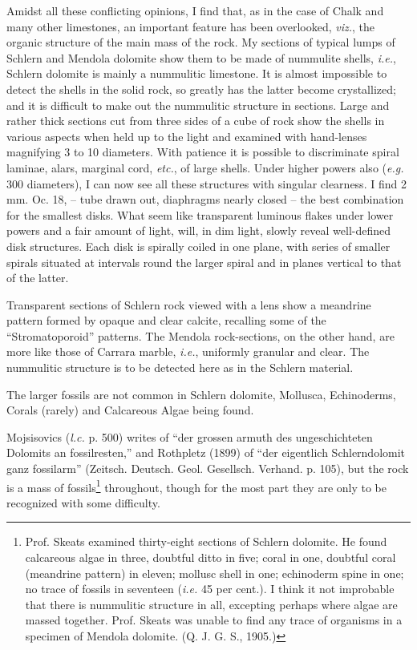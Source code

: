 \documentclass[a4paper, 12pt, oneside]{article}
\begin{document}
Amidst all these conflicting opinions, I find that, as in the case of Chalk and many other limestones, an important feature has been overlooked, \emph{viz.}, the organic structure of the main mass of the rock. My sections of typical lumps of Schlern and Mendola dolomite show them to be made of nummulite shells, \emph{i.e.}, Schlern dolomite is mainly a nummulitic limestone. It is almost impossible to detect the shells in the solid rock, so greatly has the latter become crystallized; and it is difficult to make out the nummulitic structure in sections. Large and rather thick sections cut from three sides of a cube of rock show the shells in various aspects when held up to the light and examined with hand-lenses magnifying 3 to 10 diameters. With patience it is possible to discriminate spiral laminae, alars, marginal cord, \emph{etc.}, of large shells. Under higher powers also (\emph{e.g.} 300 diameters), I can now see all these structures with singular clearness. I find 2 mm. Oc. 18, -- tube drawn out, diaphragms nearly closed -- the best combination for the smallest disks. What seem like transparent luminous flakes under lower powers and a fair amount of light, will, in dim light, slowly reveal well-defined disk structures. Each disk is spirally coiled in one plane, with series of smaller spirals situated at intervals round the larger spiral and in planes vertical to that of the latter.

Transparent sections of Schlern rock viewed with a lens show a meandrine pattern formed by opaque and clear calcite, recalling some of the ``Stromatoporoid'' patterns. The Mendola rock-sections, on the other hand, are more like those of Carrara marble, \emph{i.e.}, uniformly granular and clear. The nummulitic structure is to be detected here as in the Schlern material.

The larger fossils are not common in Schlern dolomite, Mollusca, Echinoderms, Corals (rarely) and Calcareous Algae being found.

Mojsisovics (\emph{l.c.} p. 500) writes of ``der grossen armuth des ungeschichteten Dolomits an fossilresten,'' and Rothpletz (1899) of ``der eigentlich Schlerndolomit ganz fossilarm'' (Zeitsch. Deutsch. Geol. Gesellsch. Verhand. p. 105), but the rock is a mass of fossils\footnote{Prof. Skeats examined thirty-eight sections of Schlern dolomite. He found calcareous algae in three, doubtful ditto in five; coral in one, doubtful coral (meandrine pattern) in eleven; mollusc shell in one; echinoderm spine in one; no trace of fossils in seventeen (\emph{i.e.} 45 per cent.). I think it not improbable that there is nummulitic structure in all, excepting perhaps where algae are massed together. Prof. Skeats was unable to find any trace of organisms in a specimen of Mendola dolomite. (Q. J. G. S., 1905.)} throughout, though for the most part they are only to be recognized with some difficulty.
\end{document}
